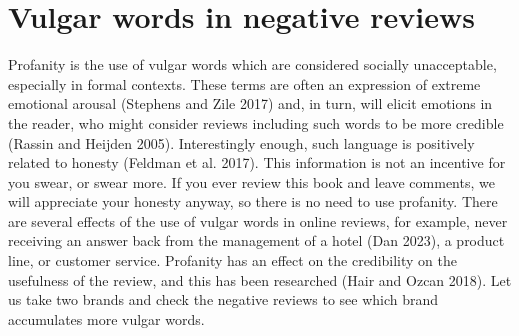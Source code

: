 \section{Vulgar words in negative
reviews}\label{vulgar-words-in-negative-reviews}

Profanity is the use of vulgar words which are considered
socially unacceptable, especially in formal contexts. These terms are often
an expression of extreme emotional arousal (Stephens and Zile 2017) and,
in turn, will elicit emotions in the reader, who might consider reviews
including such words to be more credible (Rassin and Heijden 2005). Interestingly
enough, such language is positively related to honesty (Feldman
et al. 2017). This information is not an incentive for you swear, or
swear more. If you ever review this book and leave comments, we will
appreciate your honesty anyway, so there is no need to use profanity.
There are several effects of the use of vulgar words in online reviews, for example, never receiving an answer back from the
management of a hotel (Dan 2023), a product line, or customer service.
Profanity has an effect on the credibility on the usefulness of the
review, and this has been researched (Hair and Ozcan 2018). Let us take
two brands and check the negative reviews to see which brand accumulates more
vulgar words.


